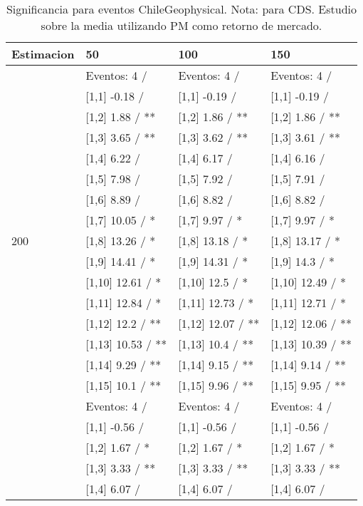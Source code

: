 \begin{table}

\caption{Significancia para eventos ChileGeophysical. Nota: para CDS. Estudio sobre la media utilizando PM como retorno de mercado.}
\centering
\begin{tabular}[t]{llll}
\toprule
Estimacion & 50 & 100 & 150\\
\midrule
 & Eventos:  4 / & Eventos:  4 / & Eventos:  4 /\\
 & {}[1,1] -0.18  / & {}[1,1] -0.19  / & {}[1,1] -0.19  /\\
 & {}[1,2] 1.88  / ** & {}[1,2] 1.86  / ** & {}[1,2] 1.86  / **\\
 & {}[1,3] 3.65  / ** & {}[1,3] 3.62  / ** & {}[1,3] 3.61  / **\\
 & {}[1,4] 6.22  / & {}[1,4] 6.17  / & {}[1,4] 6.16  /\\
\addlinespace
 & {}[1,5] 7.98  / & {}[1,5] 7.92  / & {}[1,5] 7.91  /\\
 & {}[1,6] 8.89  / & {}[1,6] 8.82  / & {}[1,6] 8.82  /\\
 & {}[1,7] 10.05  / * & {}[1,7] 9.97  / * & {}[1,7] 9.97  / *\\
200 & {}[1,8] 13.26  / * & {}[1,8] 13.18  / * & {}[1,8] 13.17  / *\\
 & {}[1,9] 14.41  / * & {}[1,9] 14.31  / * & {}[1,9] 14.3  / *\\
\addlinespace
 & {}[1,10] 12.61  / * & {}[1,10] 12.5  / * & {}[1,10] 12.49  / *\\
 & {}[1,11] 12.84  / * & {}[1,11] 12.73  / * & {}[1,11] 12.71  / *\\
 & {}[1,12] 12.2  / ** & {}[1,12] 12.07  / ** & {}[1,12] 12.06  / **\\
 & {}[1,13] 10.53  / ** & {}[1,13] 10.4  / ** & {}[1,13] 10.39  / **\\
 & {}[1,14] 9.29  / ** & {}[1,14] 9.15  / ** & {}[1,14] 9.14  / **\\
\addlinespace
 & {}[1,15] 10.1  / ** & {}[1,15] 9.96  / ** & {}[1,15] 9.95  / **\\
 & Eventos:  4 / & Eventos:  4 / & Eventos:  4 /\\
 & {}[1,1] -0.56  / & {}[1,1] -0.56  / & {}[1,1] -0.56  /\\
 & {}[1,2] 1.67  / * & {}[1,2] 1.67  / * & {}[1,2] 1.67  / *\\
 & {}[1,3] 3.33  / ** & {}[1,3] 3.33  / ** & {}[1,3] 3.33  / **\\
\addlinespace
 & {}[1,4] 6.07  / & {}[1,4] 6.07  / & {}[1,4] 6.07  /\\

\end{tabular}
\end{table}
